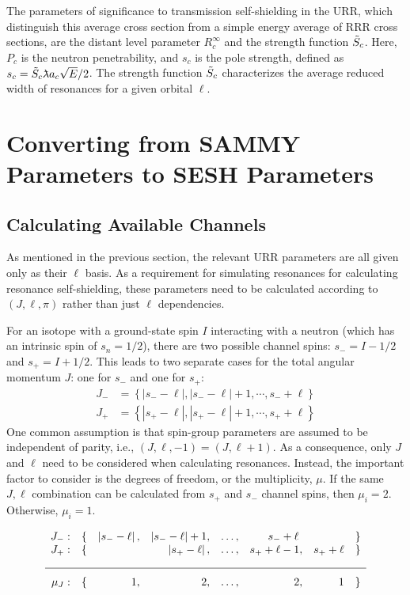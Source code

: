 The parameters of significance to transmission self-shielding in the URR, which distinguish this average cross section from a simple energy average of RRR cross sections, are the distant level parameter $R^\infty_c$ and the strength function $\Tilde{S}_c$. Here, $P_c$ is the neutron penetrability, and $s_c$ is the pole strength, defined as $s_c = \Tilde{S}_c\lambdabar a_c \sqrt{E}/2$. The strength function $\Tilde{S}_c$ characterizes the average reduced width of resonances for a given orbital $\ell$.


\section{Converting from SAMMY Parameters to SESH Parameters}
    \subsection{Calculating Available Channels}

    As mentioned in the previous section, the relevant URR parameters are all given only as their $\ell$ basis. As a requirement for simulating resonances for calculating resonance self-shielding, these parameters need to be calculated according to $(J,\ell,\pi)$ rather than just $\ell$ dependencies.

    For an isotope with a ground-state spin $I$ interacting with a neutron (which has an intrinsic spin of $s_n = 1/2$), there are two possible channel spins: $s_{-} = I - 1/2$ and $s_{+} = I + 1/2$. This leads to two separate cases for the total angular momentum $J$: one for $s_{-}$ and one for $s_{+}$:
    \begin{align}
        J_{-} &= \left\{ \left|s_{-} - \ell\right|, \left|s_{-} - \ell\right| + 1, \cdots, s_{-} + \ell \right\}\\
        J_{+} &= \left\{ \left|s_{+} - \ell\right|, \left|s_{+} - \ell\right| + 1, \cdots, s_{+} + \ell \right\}
    \end{align}
    One common assumption is that spin-group parameters are assumed to be independent of parity, i.e., $(J, \ell, -1) = (J, \ell +1)$. As a consequence, only $J$ and $\ell$ need to be considered when calculating resonances. Instead, the important factor to consider is the degrees of freedom, or the multiplicity, $\mu$. If the same $J,\ell$ combination can be calculated from $s_{+}$ and $s_{-}$ channel spins, then $\mu_i = 2$. Otherwise, $\mu_i=1$.

    \begin{equation}
        \begin{array}{rrrrrrrr}
J_{-}: & \{ & \left|s_{-} - \ell\right|, & \left|s_{-} - \ell\right| + 1, & \dots, & s_{-} + \ell ~ & & \} \\
J_{+}: & \{ & & \left|s_{+} - \ell\right|, & \dots, & s_{+} + \ell-1, & s_{+} + \ell & \} \\[1em] \hline \\[-0.5em]
\mu_J: & \{& 1, & 2, & \dots, & 2, & 1 & \} \\
\end{array}
    \end{equation}

